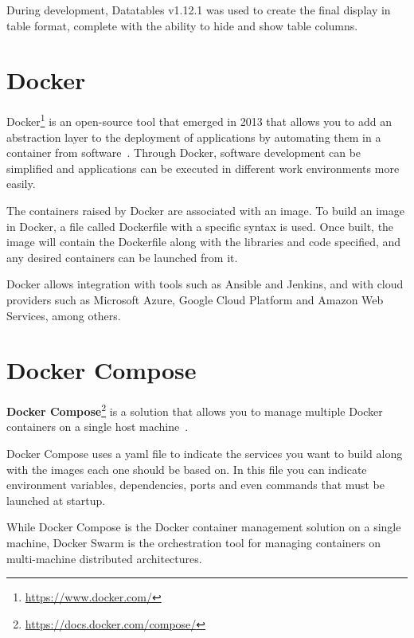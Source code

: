 \nonzeroparskip During development, Datatables v1.12.1 was used to create the final display in table format, complete with the ability to hide and show table columns.

\section{Docker}

\nonzeroparskip Docker\footnote{\url{https://www.docker.com/}} is an open-source tool that emerged in 2013 that allows you to add an abstraction layer to the deployment of applications by automating them in a container from software~\cite{docker}. Through Docker, software development can be simplified and applications can be executed in different work environments more easily.

\nonzeroparskip The containers raised by Docker are associated with an image. To build an image in Docker, a file called Dockerfile with a specific syntax is used. Once built, the image will contain the Dockerfile along with the libraries and code specified, and any desired containers can be launched from it.

\nonzeroparskip Docker allows integration with tools such as Ansible and Jenkins, and with cloud providers such as Microsoft Azure, Google Cloud Platform and Amazon Web Services, among others.

\section{Docker Compose}

\nonzeroparskip \textbf{Docker Compose}\footnote{\url{https://docs.docker.com/compose/}} is a solution that allows you to manage multiple Docker containers on a single host machine~\cite{docker_compose}.

\nonzeroparskip Docker Compose uses a yaml file to indicate the services you want to build along with the images each one should be based on. In this file you can indicate environment variables, dependencies, ports and even commands that must be launched at startup.

\nonzeroparskip While Docker Compose is the Docker container management solution on a single machine, Docker Swarm is the orchestration tool for managing containers on multi-machine distributed architectures.
